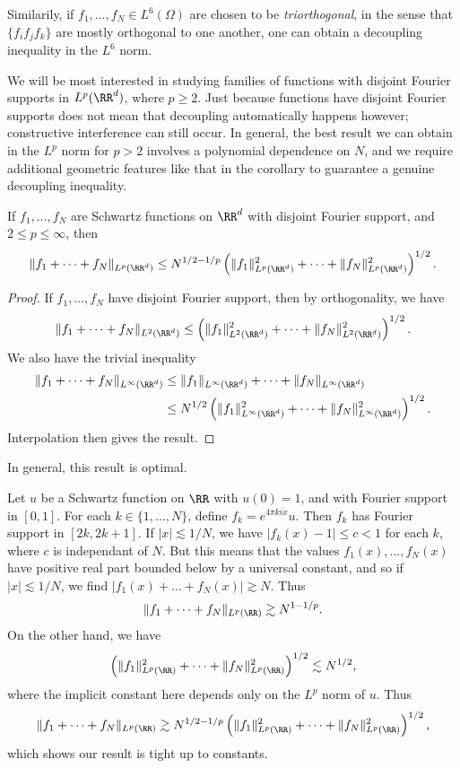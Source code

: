 \begin{remark}
  Similarily, if $f_1, \dots, f_N \in L^6(\Omega)$ are chosen to be \emph{triorthogonal}, in the sense that $\{ f_i f_j f_k \}$ are mostly orthogonal to one another, one can obtain a decoupling inequality in the $L^6$ norm.
\end{remark}

We will be most interested in studying families of functions with disjoint Fourier supports in $L^p(\RR^d)$, where $p \geq 2$. Just because functions have disjoint Fourier supports does not mean that decoupling automatically happens however; constructive interference can still occur. In general, the best result we can obtain in the $L^p$ norm for $p > 2$ involves a polynomial dependence on $N$, and we require additional geometric features like that in the corollary to guarantee a genuine decoupling inequality.

\begin{theorem}
  If $f_1, \dots, f_N$ are Schwartz functions on $\RR^d$ with disjoint Fourier support, and $2 \leq p \leq \infty$, then
  \[ \| f_1 + \dots + f_N \|_{L^p(\RR^d)} \leq N^{1/2 - 1/p} \left( \| f_1 \|_{L^p(\RR^d)}^2 + \dots + \| f_N \|_{L^p(\RR^d)}^2 \right)^{1/2}. \]
\end{theorem}
\begin{proof}
  If $f_1, \dots, f_N$ have disjoint Fourier support, then by orthogonality, we have
  \[ \| f_1 + \dots + f_N \|_{L^2(\RR^d)} \leq \left( \| f_1 \|_{L^2(\RR^d)}^2 + \dots + \| f_N \|_{L^2(\RR^d)}^2 \right)^{1/2}. \]
  We also have the trivial inequality
  \begin{align*}
    \| f_1 + \dots + f_N \|_{L^\infty(\RR^d)} &\leq \| f_1 \|_{L^\infty(\RR^d)} + \dots + \| f_N \|_{L^\infty(\RR^d)}\\
    &\leq N^{1/2} \left( \| f_1 \|_{L^\infty(\RR^d)}^2 + \dots + \| f_N \|_{L^\infty(\RR^d)}^2 \right)^{1/2}.
  \end{align*}
  Interpolation then gives the result.
\end{proof}

In general, this result is optimal.

\begin{example}
  Let $u$ be a Schwartz function on $\RR$ with $u(0) = 1$, and with Fourier support in $[0,1]$. For each $k \in \{ 1, \dots, N \}$, define $f_k = e^{4 \pi k i x} u$. Then $f_k$ has Fourier support in $[2k,2k+1]$. If $|x| \lesssim 1/N$, we have $|f_k(x) - 1| \leq c < 1$ for each $k$, where $c$ is independant of $N$. But this means that the values $f_1(x), \dots, f_N(x)$ have positive real part bounded below by a universal constant, and so if $|x| \lesssim 1/N$, we find $|f_1(x) + \dots + f_N(x)| \gtrsim N$. Thus
  \[ \| f_1 + \dots + f_N \|_{L^p(\RR)} \gtrsim N^{1 - 1/p}. \]
  On the other hand, we have
  \[ \left( \| f_1 \|_{L^p(\RR)}^2 + \dots + \| f_N \|_{L^p(\RR)}^2 \right)^{1/2} \lesssim N^{1/2}, \]
  where the implicit constant here depends only on the $L^p$ norm of $u$. Thus
  \[ \| f_1 + \dots + f_N \|_{L^p(\RR)} \gtrsim N^{1/2 - 1/p} \left( \| f_1 \|_{L^p(\RR)}^2 + \dots + \| f_N \|_{L^p(\RR)}^2 \right)^{1/2}, \]
  which shows our result is tight up to constants.
\end{example}

